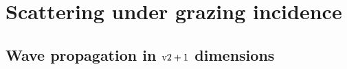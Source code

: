\section{Scattering under grazing incidence}\label{Sdwba}

\subsection[Wave propagation in $2+1$ dimensions]{Wave propagation in $\text{v}{2+1}$ dimensions}\label{Swave21}

